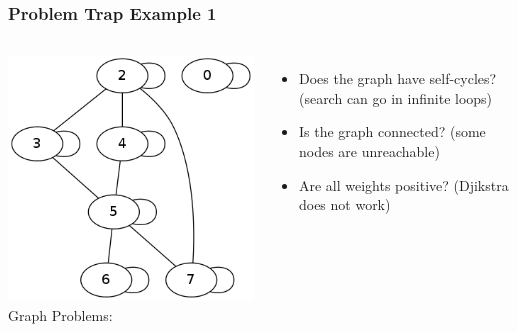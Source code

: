 \documentclass{beamer}
\begin{document}
\begin{frame}
  \frametitle{Problem Trap Example 1}
  \begin{columns}[T]
    \includegraphics[width=1\textwidth]{img/graph1}    
    Graph Problems:
    \begin{itemize}
    \item Does the graph have self-cycles? (search can go in infinite loops)
      \vspace{.5cm}

    \item Is the graph connected? (some nodes are unreachable)
      \vspace{.5cm}

    \item Are all weights positive? (Djikstra does not work)
    \end{itemize}
  \end{columns}
\end{frame}
\end{document}
